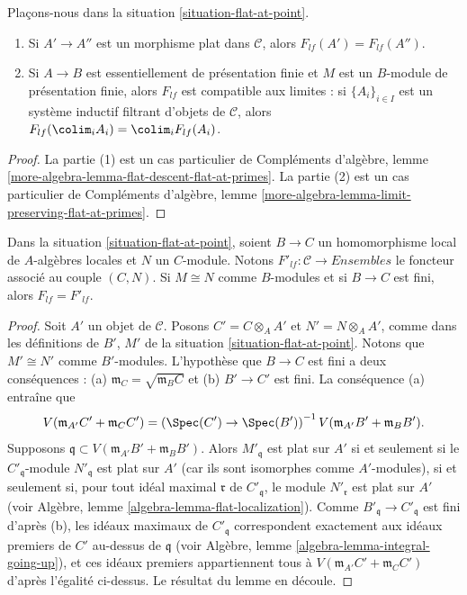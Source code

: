 \begin{lemma}
\label{lemma-flat-at-point}
Plaçons-nous dans la situation \ref{situation-flat-at-point}.
\begin{enumerate}
\item Si $A' \to A''$ est un morphisme plat dans $\mathcal{C}$,
alors $F_{lf}(A') = F_{lf}(A'')$.
\item Si $A \to B$ est essentiellement de présentation finie et
$M$ est un $B$-module de présentation finie, alors $F_{lf}$ est compatible aux
limites : si $\{A_i\}_{i \in I}$ est un
système inductif filtrant d'objets de $\mathcal{C}$, alors
$F_{lf}(\colim_i A_i) = \colim_i F_{lf}(A_i)$.
\end{enumerate}
\end{lemma}

\begin{proof}
La partie (1) est un cas particulier de
Compléments d'algèbre,
lemme \ref{more-algebra-lemma-flat-descent-flat-at-primes}.
La partie (2) est un cas particulier de
Compléments d'algèbre,
lemme \ref{more-algebra-lemma-limit-preserving-flat-at-primes}.
\end{proof}

\begin{lemma}
\label{lemma-flat-at-point-finite}
Dans la situation \ref{situation-flat-at-point}, soient $B \to C$ un homomorphisme local de
$A$-algèbres locales et $N$ un $C$-module. Notons
$F'_{lf} : \mathcal{C} \to \textit{Ensembles}$ le foncteur associé au couple
$(C, N)$. Si $M \cong N$ comme $B$-modules et si $B \to C$ est fini, alors
$F_{lf} = F'_{lf}$.
\end{lemma}

\begin{proof}
Soit $A'$ un objet de $\mathcal{C}$. Posons $C' = C \otimes_A A'$
et $N' = N \otimes_A A'$, comme dans les définitions de $B'$, $M'$ de la
situation \ref{situation-flat-at-point}.
Notons que $M' \cong N'$ comme $B'$-modules.
L'hypothèse que $B \to C$ est fini a deux conséquences :
(a) $\mathfrak m_C = \sqrt{\mathfrak m_B C}$ et (b)
$B' \to C'$ est fini. La conséquence (a) entraîne que
$$
V(\mathfrak m_{A'}C' + \mathfrak m_C C')
=
\left(
\Spec(C') \to \Spec(B')
\right)^{-1}V(\mathfrak m_{A'}B' + \mathfrak m_B B').
$$
Supposons $\mathfrak q \subset V(\mathfrak m_{A'}B' + \mathfrak m_B B')$.
Alors $M'_{\mathfrak q}$ est plat sur $A'$ si et seulement si
le $C'_{\mathfrak q}$-module $N'_{\mathfrak q}$ est plat sur $A'$
(car ils sont isomorphes comme $A'$-modules), si et seulement si,
pour tout idéal maximal $\mathfrak r$ de $C'_{\mathfrak q}$,
le module $N'_{\mathfrak r}$ est plat sur $A'$ (voir
Algèbre, lemme \ref{algebra-lemma-flat-localization}).
Comme $B'_{\mathfrak q} \to C'_{\mathfrak q}$ est fini d'après (b),
les idéaux maximaux de $C'_{\mathfrak q}$ correspondent exactement
aux idéaux premiers de $C'$ au-dessus de $\mathfrak q$ (voir
Algèbre, lemme \ref{algebra-lemma-integral-going-up}),
et ces idéaux premiers appartiennent tous à
$V(\mathfrak m_{A'}C' + \mathfrak m_C C')$ d'après
l'égalité ci-dessus. Le résultat du lemme en découle.
\end{proof}


